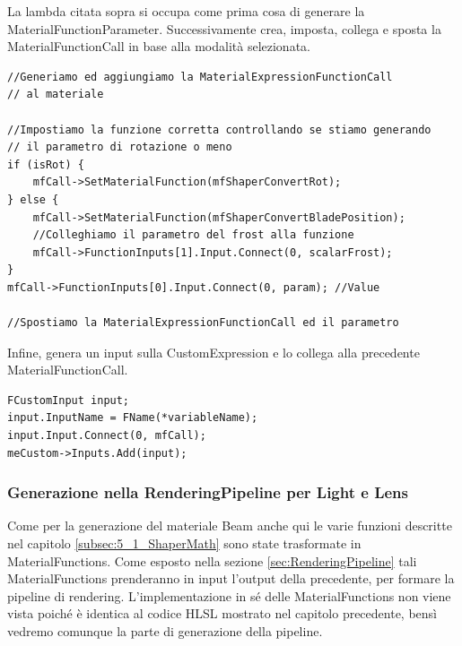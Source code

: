 \documentclass[main.tex]{subfiles}
\begin{document}
La lambda citata sopra si occupa come prima cosa di generare la MaterialFunctionParameter.
Successivamente crea, imposta, collega e sposta la MaterialFunctionCall in base alla modalità selezionata.
\begin{lstlisting}
//Generiamo ed aggiungiamo la MaterialExpressionFunctionCall
// al materiale

//Impostiamo la funzione corretta controllando se stiamo generando 
// il parametro di rotazione o meno
if (isRot) {
    mfCall->SetMaterialFunction(mfShaperConvertRot);
} else {
    mfCall->SetMaterialFunction(mfShaperConvertBladePosition);
    //Colleghiamo il parametro del frost alla funzione
    mfCall->FunctionInputs[1].Input.Connect(0, scalarFrost);
}
mfCall->FunctionInputs[0].Input.Connect(0, param); //Value

//Spostiamo la MaterialExpressionFunctionCall ed il parametro
\end{lstlisting}
Infine, genera un input sulla CustomExpression e lo collega alla precedente MaterialFunctionCall.
\begin{lstlisting}
FCustomInput input;
input.InputName = FName(*variableName);
input.Input.Connect(0, mfCall);
meCustom->Inputs.Add(input);
\end{lstlisting}

\subsubsection{Generazione nella RenderingPipeline per Light e Lens}\label{subsec:5_1_ShaperRenderingPipeline}
Come per la generazione del materiale Beam anche qui le varie funzioni descritte nel capitolo \ref{subsec:5_1_ShaperMath} sono state trasformate in MaterialFunctions. Come esposto nella sezione \ref{sec:RenderingPipeline} tali MaterialFunctions prenderanno in input l'output della precedente, per formare la pipeline di rendering. L'implementazione in sé delle MaterialFunctions non viene vista poiché è identica al codice HLSL mostrato nel capitolo precedente, bensì vedremo comunque la parte di generazione della pipeline. \newline
\end{document}
